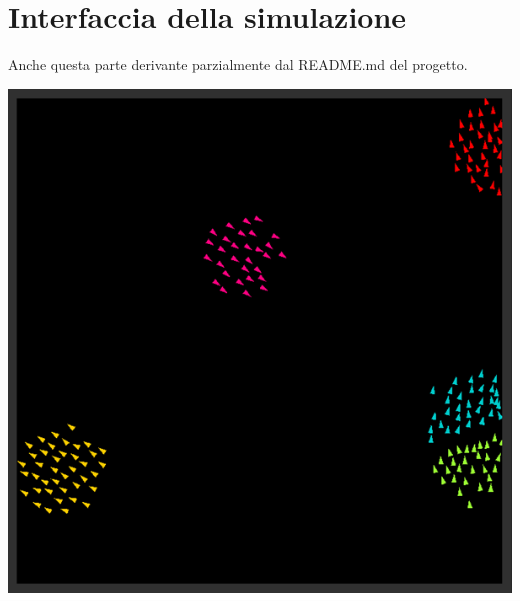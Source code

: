 \documentclass[10pt,a4paper]{article}
\begin{document}
\newpage

\section{Interfaccia della simulazione}

Anche questa parte derivante parzialmente dal README.md del progetto.





\begin{center}
    \includegraphics[width=1.0\textwidth]{../images/interface.png}
\end{center}
\end{document}
